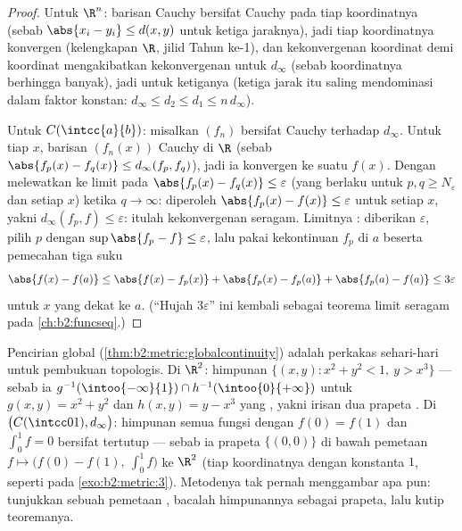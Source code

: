 \begin{proof}
Untuk $\R^n$: barisan Cauchy bersifat Cauchy pada tiap koordinatnya
(sebab $\abs{x_i - y_i} \leq d(x,y)$ untuk ketiga jaraknya), jadi tiap
koordinatnya konvergen (kelengkapan $\R$, jilid Tahun ke-1), dan
kekonvergenan koordinat demi koordinat mengakibatkan kekonvergenan untuk
$d_\infty$ (sebab koordinatnya berhingga banyak), jadi untuk ketiganya
(ketiga jarak itu saling mendominasi dalam faktor konstan: $d_\infty
\leq d_2 \leq d_1 \leq n\,d_\infty$).

Untuk $C(\intcc{a}{b})$: misalkan $(f_n)$ bersifat Cauchy terhadap
$d_\infty$. Untuk tiap $x$, barisan $(f_n(x))$ Cauchy di $\R$ (sebab
$\abs{f_p(x) - f_q(x)} \leq d_\infty(f_p, f_q)$), jadi ia konvergen ke
suatu $f(x)$. Dengan melewatkan ke limit pada $\abs{f_p(x) -
f_q(x)} \leq \varepsilon$ (yang berlaku untuk $p, q \geq N_\varepsilon$
dan setiap $x$) ketika $q \to \infty$: diperoleh $\abs{f_p(x) - f(x)} \leq \varepsilon$ untuk
setiap $x$, yakni $d_\infty(f_p, f) \leq \varepsilon$: itulah kekonvergenan
seragam. Limitnya : diberikan $\varepsilon$, pilih $p$ dengan
$\sup\abs{f_p - f} \leq \varepsilon$, lalu pakai kekontinuan $f_p$ di $a$
beserta pemecahan tiga suku
\[
\abs{f(x) - f(a)} \leq \abs{f(x) - f_p(x)} + \abs{f_p(x) - f_p(a)}
+ \abs{f_p(a) - f(a)} \leq 3\varepsilon
\]
untuk $x$ yang dekat ke $a$. (``Hujah $3\varepsilon$'' ini kembali
sebagai teorema limit seragam pada \cref{ch:b2:funcseq}.)
\end{proof}

\begin{example}\label{ex:b2:metric:recognize}
Pencirian global
(\cref{thm:b2:metric:globalcontinuity}) adalah perkakas sehari-hari untuk
pembukuan topologis. Di $\R^2$: himpunan $\{(x, y) : x^2 + y^2
< 1,\ y > x^3\}$  --- sebab ia $g^{-1}(\intoo{-\infty}{1})
\cap h^{-1}(\intoo{0}{+\infty})$ untuk $g(x,y) = x^2 + y^2$ dan
$h(x, y) = y - x^3$ yang , yakni irisan dua prapeta
. Di $\bigl(C(\intcc01), d_\infty\bigr)$: himpunan semua
fungsi dengan $f(0) = f(1)$ dan $\int_0^1 f = 0$ bersifat tertutup ---
sebab ia prapeta $\{(0,0)\}$ di bawah pemetaan  $f \mapsto
\bigl(f(0) - f(1),\ \int_0^1 f\bigr)$ ke $\R^2$ (tiap
koordinatnya  dengan konstanta $1$, seperti pada
\cref{exo:b2:metric:3}). Metodenya tak pernah menggambar apa pun:
tunjukkan sebuah pemetaan , bacalah himpunannya sebagai prapeta,
lalu kutip teoremanya.
\end{example}

